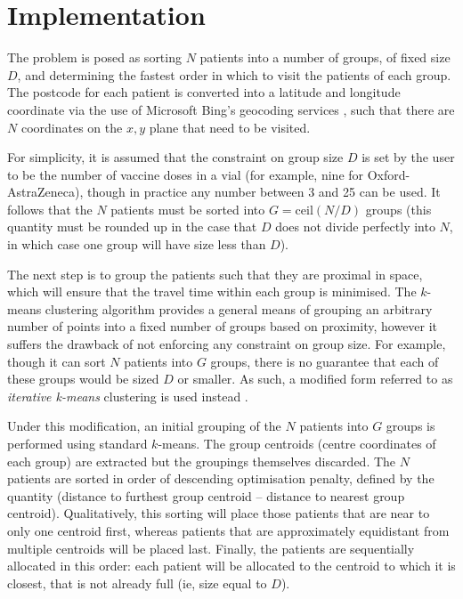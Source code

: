 \documentclass[11pt]{amsart}
\begin{document}
\section{Implementation}

The problem is posed as sorting $N$ patients into a number of groups, of fixed size $D$, and determining the fastest order in which to visit the patients of each group. The postcode for each patient is converted into a latitude and longitude coordinate via the use of Microsoft Bing’s geocoding services \cite{X}, such that there are $N$ coordinates on the $x,y$ plane that need to be visited. 

For simplicity, it is assumed that the constraint on group size $D$ is set by the user to be the number of vaccine doses in a vial (for example, nine for Oxford-AstraZeneca), though in practice any number between 3 and 25 can be used. It follows that the $N$ patients must be sorted into $G = \mathrm{ceil}(N / D)$ groups (this quantity must be rounded up in the case that $D$ does not divide perfectly into $N$, in which case one group will have size less than $D$). 

The next step is to group the patients such that they are proximal in space, which will ensure that the travel time within each group is minimised. The $k$-means clustering algorithm \cite{X} provides a general means of grouping an arbitrary number of points into a fixed number of groups based on proximity, however it suffers the drawback of not enforcing any constraint on group size. For example, though it can sort $N$ patients into $G$ groups, there is no guarantee that each of these groups would be sized $D$ or smaller. As such, a modified form referred to as \textit{iterative k-means} clustering is used instead \cite{X}. 

Under this modification, an initial grouping of the $N$ patients into $G$ groups is performed using standard $k$-means. The group centroids (centre coordinates of each group) are extracted but the groupings themselves discarded. The $N$ patients are sorted in order of descending optimisation penalty, defined by the quantity (distance to furthest group centroid – distance to nearest group centroid). Qualitatively, this sorting will place those patients that are near to only one centroid first, whereas patients that are approximately equidistant from multiple centroids will be placed last. Finally, the patients are sequentially allocated in this order: each patient will be allocated to the centroid to which it is closest, that is not already full (ie, size equal to $D$). 
\end{document}
